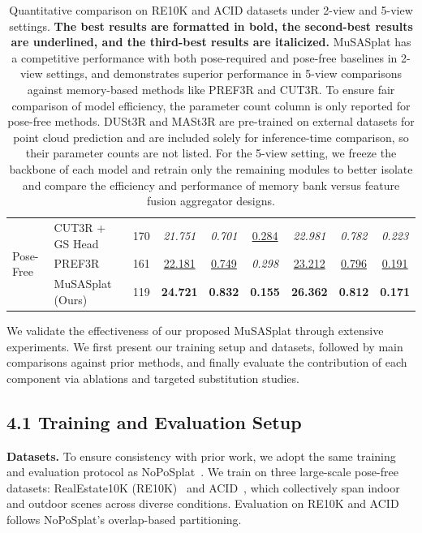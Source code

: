 \documentclass[letterpaper]{article} %
\begin{document}
\begin{table}[t]
\begin{tabular}{ll|c|ccc|ccc}
\midrule
\multirow{3}{*}{Pose-Free}
& CUT3R + GS Head  ~\cite{wang2025continuous}  &170     & \textit{21.751} & \textit{0.701} & \underline{0.284} & \textit{22.981} & \textit{0.782} & \textit{0.223} \\
& PREF3R ~\cite{chen2024pref3r} & 161                & \underline{22.181} & \underline{0.749} & \textit{0.298} & \underline{23.212} & \underline{0.796} & \underline{0.191} \\
& MuSASplat (Ours)&119  & \textbf{24.721} & \textbf{0.832} & \textbf{0.155} & \textbf{26.362} & \textbf{0.812} & \textbf{0.171} \\
\bottomrule
\end{tabular}
\caption{Quantitative comparison on RE10K and ACID datasets under 2-view and 5-view settings. \textbf{The best results are formatted in bold, the second-best results are underlined, and the third-best results are italicized.} MuSASplat has a competitive performance with both pose-required and pose-free baselines in 2-view settings, and demonstrates superior performance in 5-view comparisons against memory-based methods like PREF3R and CUT3R. To ensure fair comparison of model efficiency, the parameter count column is only reported for pose-free methods. DUSt3R and MASt3R are pre-trained on external datasets for point cloud prediction and are included solely for inference-time comparison, so their parameter counts are not listed. For the 5-view setting, we freeze the backbone of each model and retrain only the remaining modules to better isolate and compare the efficiency and performance of memory bank versus feature fusion aggregator designs.}
\label{tab:main_table}
\end{table}
We validate the effectiveness of our proposed MuSASplat through extensive experiments. We first present our training setup and datasets, followed by main comparisons against prior methods, and finally evaluate the contribution of each component via ablations and targeted substitution studies.

\subsection{4.1 Training and Evaluation Setup}
\label{subsec:exp_setup}

\noindent\textbf{Datasets.}  
To ensure consistency with prior work, we adopt the same training and evaluation protocol as NoPoSplat~\cite{ye2024no}. We train on three large-scale pose-free datasets: RealEstate10K (RE10K)~\cite{zhou2018stereo} and ACID~\cite{liu2021infinite}, which collectively span indoor and outdoor scenes across diverse conditions. Evaluation on RE10K and ACID follows NoPoSplat's overlap-based partitioning.
\end{document}
